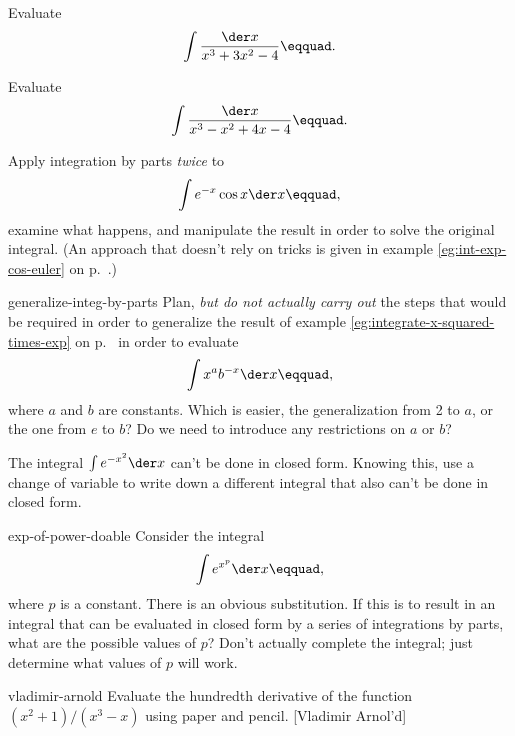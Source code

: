 \begin{hwsection}
\begin{hw}
Evaluate
\begin{equation*}
  \int \frac{\der x}{x^3+3x^2-4}\eqquad.
\end{equation*}
\end{hw}

\begin{hw}
Evaluate
\begin{equation*}
  \int \frac{\der x}{x^3-x^2+4x-4}\eqquad.
\end{equation*}
\end{hw}

\begin{hw}\label{hw:integration-by-parts-twice-trick}
Apply integration by parts \emph{twice} to
\begin{equation*}
  \int e^{-x}\cos x \der x\eqquad,
\end{equation*}
examine what happens, and manipulate the result in order to solve the original integral.
(An approach that doesn't rely on tricks is given in example \ref{eg:int-exp-cos-euler} on p.~\pageref{eg:int-exp-cos-euler}.)
\end{hw}

\begin{hwwithsoln}{generalize-integ-by-parts}
Plan, \emph{but do not actually carry out} the steps that would be required in order to generalize
the result of example \ref{eg:integrate-x-squared-times-exp} on p.~\pageref{eg:integrate-x-squared-times-exp}
in order to evaluate
\begin{equation*}
  \int x^a b^{-x} \der x\eqquad,
\end{equation*}
where $a$ and $b$ are constants.
Which is easier, the generalization from 2 to $a$, or the one from $e$ to $b$?
Do we need to introduce any restrictions on $a$ or $b$?
\end{hwwithsoln}

\begin{hw}
The integral $\int e^{-x^2}\der x$ can't be done in closed form. Knowing this, use a change
of variable to write down a different integral that also can't be done in closed form.
\end{hw}

\begin{hwwithsoln}{exp-of-power-doable}
Consider the integral
\begin{equation*}
  \int e^{x^p} \der x\eqquad,
\end{equation*}
where $p$ is a constant. There is an obvious substitution. If this is to result in
an integral that can be evaluated in closed form by a series of integrations by parts,
what are the possible values of $p$? Don't actually complete the integral; just determine
what values of $p$ will work.
\end{hwwithsoln}

\begin{hwwithsoln}[2]{vladimir-arnold}
Evaluate the hundredth derivative of the function\\ $(x^2+1)/(x^3-x)$ using paper and pencil.
[Vladimir Arnol'd]
\end{hwwithsoln}


\end{hwsection}

